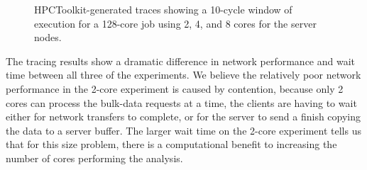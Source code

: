 \begin{figure}[htbp]
\begin{centering}
\vspace{-12pt}




\caption[Performance trace of 128-core run with different core
counts.]{HPCToolkit-generated traces showing a 10-cycle window of execution
for a 128-core job using 2, 4, and 8 cores for the server nodes.}
\label{fig:node-scaling-traces}
\end{centering}
\end{figure}

The tracing results show a dramatic difference in network performance and wait
time between all three of the experiments.  We believe the relatively poor
network performance in the 2-core experiment is caused by contention, because
only 2 cores can process the bulk-data requests at a time, the clients are
having to wait either for network transfers to complete, or for the server to
send a finish copying the data to a server buffer.  The larger wait time on the
2-core experiment tells us that for this size problem, there is a computational
benefit to increasing the number of cores performing the analysis.



